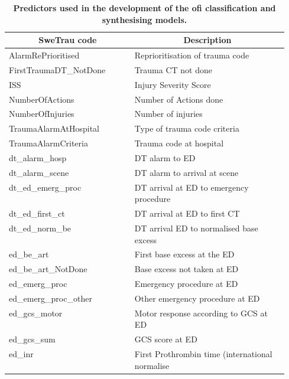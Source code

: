 \documentclass[12pt, a4paper]{article}
\begin{document}
\begin{appendices}
	\renewcommand*{\arraystretch}{1.2}
	\begin{longtable}[c]{@{}|l|p{0.55\linewidth}|@{}}
		\caption{\textbf{Predictors used in the development of the \acrlong{ofi} classification and synthesising models.}}%
		\label{tab:predictors}                                                                   \\
		\hline
		\multicolumn{1}{|c|}{\textbf{SweTrau code}} & \multicolumn{1}{|c|}{\textbf{Description}} \\\hline
		\endfirsthead
		\endhead
		AlarmRePrioritised                          & Reprioritisation of trauma code            \\\hline FirstTraumaDT\_NotDone & Trauma CT not done \\\hline ISS
		                                            & Injury Severity Score                      \\\hline NumberOfActions & Number of Actions done \\\hline NumberOfInjuries & Number of
		injuries                                                                                 \\\hline TraumaAlarmAtHospital & Type of trauma code criteria \\\hline TraumaAlarmCriteria & Trauma code at
		hospital                                                                                 \\\hline dt\_alarm\_hosp & DT alarm to ED \\\hline dt\_alarm\_scene & DT alarm to arrival at scene \\\hline
		dt\_ed\_emerg\_proc                         & DT arrival at ED to emergency procedure    \\\hline dt\_ed\_first\_ct & DT arrival at ED to first CT
		\\\hline dt\_ed\_norm\_be & DT arrival ED to normalised base excess \\\hline ed\_be\_art & First base excess at the ED
		\\\hline ed\_be\_art\_NotDone & Base excess not taken at ED \\\hline ed\_emerg\_proc & Emergency procedure at ED
		\\\hline ed\_emerg\_proc\_other & Other emergency procedure at ED \\\hline ed\_gcs\_motor & Motor response according to
		GCS at ED                                                                                \\\hline ed\_gcs\_sum & GCS score at ED \\\hline ed\_inr & First Prothrombin time (international normalise

\end{longtable}
\end{appendices}
\end{document}
